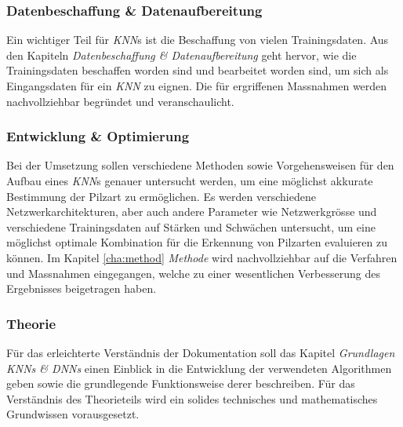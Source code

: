 \subsubsection{Datenbeschaffung \& Datenaufbereitung}
Ein wichtiger Teil für \textit{KNN}s ist die Beschaffung von vielen Trainingsdaten. Aus den Kapiteln \textit{Datenbeschaffung \& Datenaufbereitung} geht hervor, wie die Trainingsdaten beschaffen worden sind und bearbeitet worden sind, um sich als Eingangsdaten für ein \textit{KNN} zu eignen. Die für ergriffenen Massnahmen werden nachvollziehbar begründet und veranschaulicht.

\subsubsection{Entwicklung \& Optimierung}
Bei der Umsetzung sollen verschiedene Methoden sowie Vorgehensweisen für den Aufbau eines \textit{KNN}s genauer untersucht werden, um eine möglichst akkurate Bestimmung der Pilzart zu ermöglichen. Es werden verschiedene Netzwerkarchitekturen, aber auch andere Parameter wie Netzwerkgrösse und verschiedene Trainingsdaten auf Stärken und Schwächen untersucht, um eine möglichst optimale Kombination für die Erkennung von Pilzarten evaluieren zu können. Im Kapitel \ref{cha:method} \textit{Methode} wird nachvollziehbar auf die Verfahren und Massnahmen eingegangen, welche zu einer wesentlichen Verbesserung des Ergebnisses beigetragen haben.

\subsubsection{Theorie}
Für das erleichterte Verständnis der Dokumentation soll das Kapitel \textit{Grundlagen KNNs \& DNNs} einen Einblick in die Entwicklung der verwendeten Algorithmen geben sowie die grundlegende Funktionsweise derer beschreiben. Für das Verständnis des Theorieteils wird ein solides technisches und mathematisches Grundwissen vorausgesetzt.


